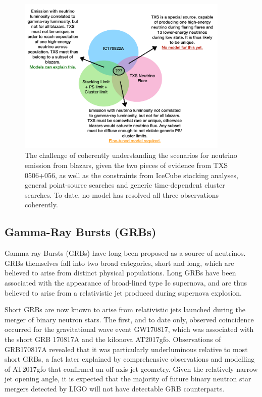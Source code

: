 \documentclass[]{article}
\begin{document}
 \begin{figure}[!ht]
 	\centering \includegraphics[width=0.9\textwidth]{txs_logic}
 	\caption{The challenge of coherently understanding the scenarios for neutrino emission from blazars, given the two pieces of evidence from TXS 0506+056, as well as the constraints from IceCube stacking analyses, general point-source searches and generic time-dependent cluster searches. To date, no model has resolved all three observations coherently.}
 	\label{fig:TXSLogic}
 \end{figure}
\subsection{Gamma-Ray Bursts (GRBs)}

Gamma-ray Bursts (GRBs) have long been proposed as a source of neutrinos. GRBs themselves fall into two broad categories, short and long, which are believed to arise from distinct physical populations. Long GRBs have been associated with the appearance of broad-lined type Ic supernova, and are thus believed to arise from a relativistic jet produced during supernova explosion. 

Short GRBs are now known to arise from relativistic jets launched during the merger of binary neutron stars. The first, and to date only, observed coincidence occurred for the gravitational wave event GW170817, which was associated with the short GRB 170817A and the kilonova AT2017gfo. Observations of GRB170817A revealed that it was particularly underluminous relative to most short GRBs, a fact later explained by comprehensive observations and modelling of AT2017gfo that confirmed an off-axis jet geometry. Given the relatively narrow jet opening angle, it is expected that the majority of future binary neutron star mergers detected by LIGO will not have detectable GRB counterparts.
\end{document}
